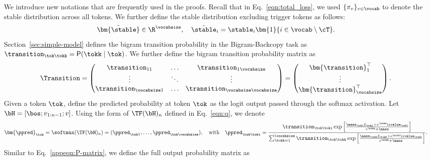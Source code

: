 We introduce new notations that are frequently used in the proofs. Recall that in Eq.~\eqref{eqn:total_loss}, we used $\{\pi_v\}_{v \in \vocab}$ to denote the stable distribution across all tokens. We further define the stable distribution excluding trigger tokens as follows:
\begin{equation}\label{appeqn:stable-dist}
\Tilde{\bm{\stable}}\in \R^\vocabsize,~~~\Tilde{\stable}_i=\stable_i \bm{1}\{i\in\vocab\setminus\cT\}.
\end{equation}
Section~\ref{sec:simple-model} defines the bigram transition probability in the Bigram-Backcopy task as $\transition_{\tok\tokk}=\sf{P}(\tokk\mid\tok)$.
We further define the bigram transition probability matrix as %
\begin{equation}\label{appeqn:P-matrix}
\Transition = \left(\begin{matrix}
\transition_{11} & \ldots & \transition_{1\vocabsize}\\
\vdots & \ddots & \vdots \\
\transition_{\vocabsize 1} & \ldots & \transition_{\vocabsize\vocabsize}\\
\end{matrix}\right) = \left(\begin{matrix}
\bm{\transition}_1^\top\\
\vdots \\
\bm{\transition}_\vocabsize^\top\\
\end{matrix}\right).
\end{equation}
Given a token $\tok$, define the predicted probability at token $\tok$ as the logit output passed through the softmax activation. Let $\bH=[\bos; v_{1:n-1}; v]$. Using the form of $\TF(\bH)_n$ defined in Eq.~\eqref{eqn:q}, we denote %
\begin{equation}\label{appeqn:pred-prob}
\bm{\ppred}_{\tok} = \softmax(\TF(\bH)_n)=(\ppred_{\tok 1},\ldots,\ppred_{\tok \vocabsize}),~~~\text{with}~~~\ppred_{\tok \toki}=\frac{\transition_{\tok\toki} \exp\Big[\frac{\mass_\toki\xi_\toki+e^{\sink}\ivalue_\toki}{e^{\sink}+\mass}\Big]}{\sum_{\tokk=1}^\vocabsize \transition_{\tok\tokk}\exp\Big[\frac{\mass_\tokk\xi_\tokk+e^{\sink}\ivalue_\tokk}{e^{\sink}+\mass}\Big]}.
\end{equation}
Similar to Eq.~\eqref{appeqn:P-matrix}, we define the full output probability matrix as
